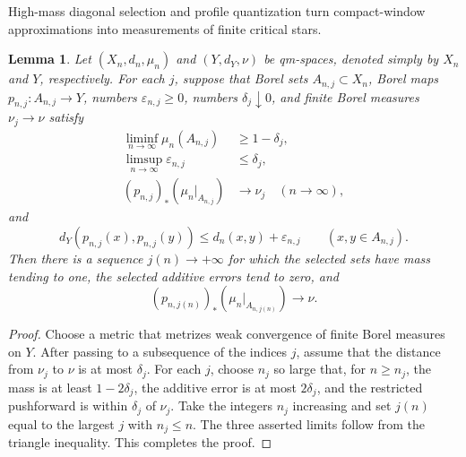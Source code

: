 \documentclass{amsart}
\numberwithin{equation}{section}
\theoremstyle{plain}
\newtheorem{lemma}[theorem]{Lemma}
\theoremstyle{definition}
\theoremstyle{remark}
\begin{document}
High-mass diagonal selection and profile quantization turn compact-window approximations into measurements of finite critical stars.

\begin{lemma}\label{lem:diagonal-high-mass-selection}
Let $(X_n,d_n,\mu_n)$ and $(Y,d_Y,\nu)$ be qm-spaces, denoted simply by $X_n$ and $Y$, respectively.  For each $j$, suppose that Borel sets $A_{n,j}\subset X_n$, Borel maps $p_{n,j}\colon A_{n,j}\to Y$, numbers $\varepsilon_{n,j}\ge0$, numbers $\delta_j\downarrow0$, and finite Borel measures $\nu_j\to\nu$ satisfy
\begin{align*}
 \liminf_{n\to\infty}\mu_n(A_{n,j})&\ge1-\delta_j,\\
 \limsup_{n\to\infty}\varepsilon_{n,j}&\le\delta_j,\\
(p_{n,j})_*(\mu_n|_{A_{n,j}})&\longrightarrow\nu_j \quad(n\to\infty),
\end{align*}
and
\[ d_Y(p_{n,j}(x),p_{n,j}(y)) \le d_n(x,y)+\varepsilon_{n,j} \qquad(x,y\in A_{n,j}). \]
Then there is a sequence $j(n)\to+\infty$ for which the selected sets have mass tending to one, the selected additive errors tend to zero, and
\[ (p_{n,j(n)})_*(\mu_n|_{A_{n,j(n)}})\longrightarrow\nu. \]
\end{lemma}

\begin{proof}
Choose a metric that metrizes weak convergence of finite Borel measures on $Y$.  After passing to a subsequence of the indices $j$, assume that the distance from $\nu_j$ to $\nu$ is at most $\delta_j$.  For each $j$, choose $n_j$ so large that, for $n\ge n_j$, the mass is at least $1-2\delta_j$, the additive error is at most $2\delta_j$, and the restricted pushforward is within $\delta_j$ of $\nu_j$.  Take the integers $n_j$ increasing and set $j(n)$ equal to the largest $j$ with $n_j\le n$.  The three asserted limits follow from the triangle inequality.
	This completes the proof.
\end{proof}
\end{document}
